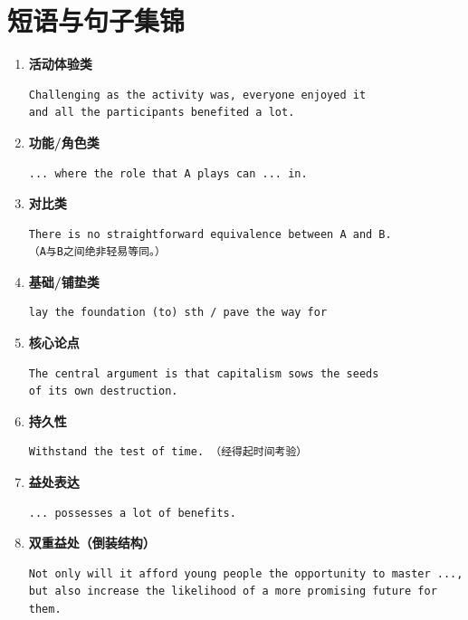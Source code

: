 \section*{短语与句子集锦}

\begin{enumerate}

\item \textbf{活动体验类}
\begin{verbatim}
Challenging as the activity was, everyone enjoyed it 
and all the participants benefited a lot.
\end{verbatim}

\item \textbf{功能/角色类}
\begin{verbatim}
... where the role that A plays can ... in.
\end{verbatim}

\item \textbf{对比类}
\begin{verbatim}
There is no straightforward equivalence between A and B.
（A与B之间绝非轻易等同。）
\end{verbatim}

\item \textbf{基础/铺垫类}
\begin{verbatim}
lay the foundation (to) sth / pave the way for
\end{verbatim}

\item \textbf{核心论点}
\begin{verbatim}
The central argument is that capitalism sows the seeds 
of its own destruction.
\end{verbatim}

\item \textbf{持久性}
\begin{verbatim}
Withstand the test of time. （经得起时间考验）
\end{verbatim}

\item \textbf{益处表达}
\begin{verbatim}
... possesses a lot of benefits.
\end{verbatim}

\item \textbf{双重益处（倒装结构）}
\begin{verbatim}
Not only will it afford young people the opportunity to master ..., 
but also increase the likelihood of a more promising future for them.
\end{verbatim}


\end{enumerate}
